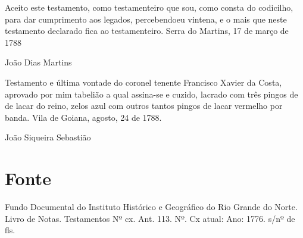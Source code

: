 \begin{refsection}
    \noindent{}Aceito este testamento, como testamenteiro que sou, como consta do codicilho, para dar cumprimento aos legados, percebendoeu vintena, e o mais que neste testamento declarado fica ao testamenteiro. Serra do Martins, 17 de março de 1788

    \vspace{1em}

    \noindent{}\hspace{30ex}João Dias Martins 

    \vspace{1em}

    \noindent{}Testamento e última vontade do coronel tenente Francisco Xavier da Costa, aprovado por mim tabelião a qual assina-se e cuzido, lacrado com três pingos de de lacar do reino, zelos azul com outros tantos pingos de lacar vermelho por banda. Vila de Goiana, agosto, 24 de 1788.

    \tabto{45ex}João Siqueira Sebastião


    \section{Fonte}

    Fundo Documental do Instituto Histórico e Geográfico do Rio Grande do Norte. Livro de Notas. Testamentos Nº cx. Ant. 113. Nº. Cx atual: Ano: 1776. s/nº de fls.

    \printbibliography[heading=subbibliography,notcategory=fullcited]

    \label{chap:historia-vida-sertoesend}

\end{refsection}

